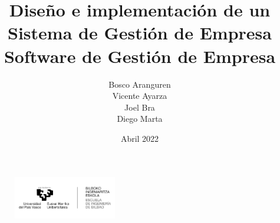 \documentclass[12pt, letterpaper]{article}
\title{{\myfont Diseño e implementación de un Sistema de Gestión de Empresa\\
\large Software de Gestión de Empresa}}
\author{Bosco Aranguren \\ Vicente Ayarza \\ Joel Bra \\ Diego Marta }
\date{Abril 2022}
\begin{document}
\maketitle
{}

\begin{figure}[b]
\centering
\includegraphics[width=170px]{logo.png}
\end{figure}

\thispagestyle{empty}
\clearpage

\clearpage
\tableofcontents
\clearpage
\listoffigures
\clearpage

\end{document}
